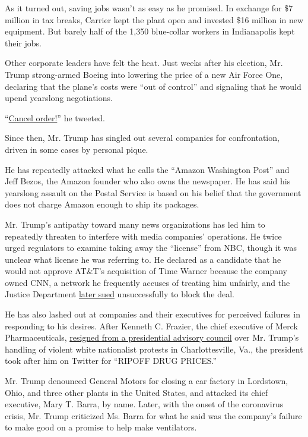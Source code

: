 As it turned out, saving jobs wasn't as easy as he promised. In exchange
for \$7 million in tax breaks, Carrier kept the plant open and invested
\$16 million in new equipment. But barely half of the 1,350 blue-collar
workers in Indianapolis kept their jobs.

Other corporate leaders have felt the heat. Just weeks after his
election, Mr. Trump strong-armed Boeing into lowering the price of a new
Air Force One, declaring that the plane's costs were ``out of control''
and signaling that he would upend yearslong negotiations.

``\href{https://www.nytimes3xbfgragh.onion/2016/12/06/us/politics/trump-air-force-one-boeing.html}{Cancel
order!}'' he tweeted.

Since then, Mr. Trump has singled out several companies for
confrontation, driven in some cases by personal pique.

He has repeatedly attacked what he calls the ``Amazon Washington Post''
and Jeff Bezos, the Amazon founder who also owns the newspaper. He has
said his yearslong assault on the Postal Service is based on his belief
that the government does not charge Amazon enough to ship its packages.

Mr. Trump's antipathy toward many news organizations has led him to
repeatedly threaten to interfere with media companies' operations. He
twice urged regulators to examine taking away the ``license'' from NBC,
though it was unclear what license he was referring to. He declared as a
candidate that he would not approve AT\&T's acquisition of Time Warner
because the company owned CNN, a network he frequently accuses of
treating him unfairly, and the Justice Department
\href{https://www.nytimes3xbfgragh.onion/2017/11/20/business/dealbook/att-time-warner-merger.html}{later
sued} unsuccessfully to block the deal.

He has also lashed out at companies and their executives for perceived
failures in responding to his desires. After Kenneth C. Frazier, the
chief executive of Merck Pharmaceuticals,
\href{https://www.nytimes3xbfgragh.onion/2017/08/14/business/merck-trump-ceos.html}{resigned
from a presidential advisory council} over Mr. Trump's handling of
violent white nationalist protests in Charlottesville, Va., the
president took after him on Twitter for ``RIPOFF DRUG PRICES.''

Mr. Trump denounced General Motors for closing a car factory in
Lordstown, Ohio, and three other plants in the United States, and
attacked its chief executive, Mary T. Barra, by name. Later, with the
onset of the coronavirus crisis, Mr. Trump criticized Ms. Barra for what
he said was the company's failure to make good on a promise to help make
ventilators.

